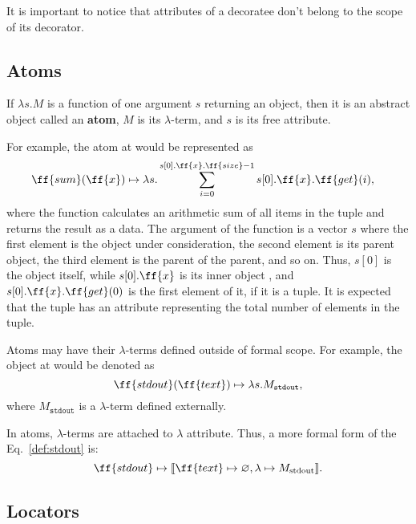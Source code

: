 It is important to notice that attributes of a decoratee
don't belong to the scope of its decorator.

\subsection{Atoms}

\begin{definition}\label{def:atom}
If \(\lambda s.M\) is a function of one argument \(s\) returning an object,
then it is an abstract object called an \textbf{atom}, \(M\) is its \(\lambda\)-term,
and \(s\) is its free attribute.
\end{definition}

For example, the atom at  would be represented as
\begin{equation}
\begin{split}
& \ff{sum}(\ff{x}) \mapsto \lambda s . \sum\limits_{i=0}^{s[0].\ff{x}.\ff{size} - 1} s[0].\ff{x}.\ff{get}(i),
\end{split}
\end{equation}
where the function calculates an arithmetic sum of all items
in the tuple  and returns the result as a data. The argument of
the function is a vector \(s\) where the first element is the object under
consideration, the second element is its parent object, the third element
is the parent of the parent, and so on. Thus, \(s[0]\) is the object
 itself, while \(s[0].\ff{x}\) is its inner object ,
and \(s[0].\ff{x}.\ff{get}(0)\) is the first element of it, if it is a tuple.
It is expected that the tuple has an attribute  representing
the total number of elements in the tuple.

Atoms may have their \(\lambda\)-terms defined outside of \phic{} formal scope.
For example, the object at  would be denoted as
\begin{equation}\label{def:stdout}
\ff{stdout}(\ff{text}) \mapsto \lambda s.M_\texttt{stdout},
\end{equation}
where \(M_\texttt{stdout}\) is a \(\lambda\)-term defined externally.

In atoms, \(\lambda\)-terms are attached to \(\lambda\) attribute.
Thus, a more formal form of the Eq.~\ref{def:stdout} is:
\begin{equation*}
\ff{stdout} \mapsto \llbracket \ff{text} \mapsto \varnothing, \lambda \mapsto M_\text{stdout} \rrbracket.
\end{equation*}

\subsection{Locators}

